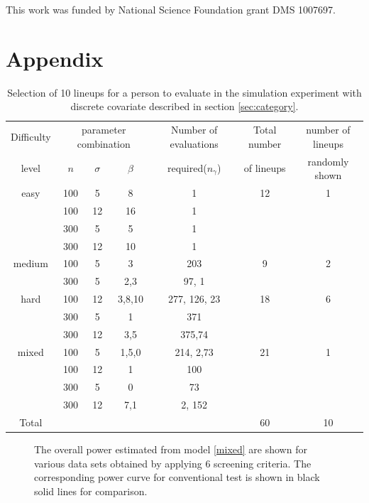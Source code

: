 \documentclass{article}
\begin{document}
This work was funded by National Science Foundation grant DMS 1007697.

%
%

%


\section*{Appendix}

\begin{table}[hbtp]
\caption{Selection of 10 lineups for a person to evaluate in the simulation experiment with discrete covariate described in section \ref{sec:category}.} 
\centering
\begin{tabular}{c c c c  c c c}
\hline\hline
Difficulty& \multicolumn{3}{c}{parameter combination}& Number of evaluations &Total number  & number of lineups\\
level & $n$ & $\sigma$ & $\beta$ &required($n_{\gamma}$) & of lineups & randomly shown \\
\hline
easy&100& 5&8 & 1& 12 & 1\\
&100&12&16 &1&&\\
&300& 5&5 &1&&\\
&300&12&10 &1 &&\\
\hline
medium&100& 5&3 &203 & 9 &2\\
&300& 5&2,3 & 97, 1&&\\
\hline
hard&100&12&3,8,10 & 277, 126, 23& 18 &6\\
&300& 5&1 & 371 &&\\
&300&12&3,5& 375,74 &&\\
\hline
mixed&100& 5&1,5,0& 214, 2,73 & 21 &1\\
&100&12&1& 100& &\\
&300& 5&0 & 73&&\\
&300&12&7,1& 2, 152&&\\
\hline
Total &&&&&60&10\\
\hline
\end{tabular}
\label{tbl:dist_lineup1}
\end{table} 

\begin{figure}[hbtp]
   \centering
       \caption{The overall power estimated from model \ref{mixed} are shown for various data sets obtained by applying 6 screening criteria.  The corresponding power curve for conventional test is shown in black solid lines for comparison.}
       \label{fig:power_screening}
\end{figure}
\end{document}

